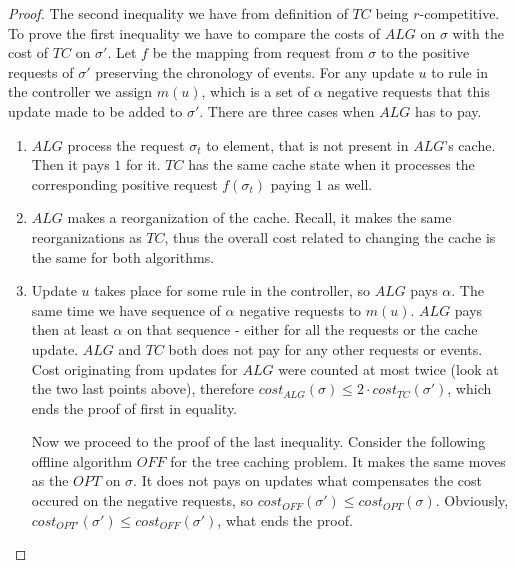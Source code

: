 \begin{proof}
The second inequality we have from definition of $TC$ being $r$-competitive. To
prove the first inequality we have to compare the costs of $ALG$ on $\sigma$
with the cost of $TC$ on $\sigma'$. Let $f$
be the mapping from request from $\sigma$ to the positive requests of $\sigma'$
preserving the chronology of events. For any update $u$ to rule in the
controller we assign $m(u)$, which is a set of $\alpha$ negative requests that this
update made to be added to $\sigma'$. There are three cases when $ALG$ has to pay.
\begin{enumerate}
\item $ALG$ process the request $\sigma_t$ to element, that is not present in
$ALG$'s cache. Then
it pays $1$ for it. $TC$ has the same cache state when it processes the corresponding
positive request $f(\sigma_t)$ paying $1$ as well.
\item $ALG$ makes a reorganization of the cache. Recall, it makes the same
reorganizations as $TC$, thus the overall cost related to changing the cache is
the same for both algorithms.
\item Update $u$ takes place for some rule in the controller, so $ALG$ pays $\alpha$.
The same time we have sequence of $\alpha$ negative requests to $m(u)$. $ALG$
pays then at least $\alpha$ on that sequence - either for all the requests or the
cache update.
$ALG$ and $TC$ both does not pay for any other requests or events. Cost originating
from updates for $ALG$ were counted at most twice (look at the two last points
above), therefore $cost_{ALG}(\sigma) \leq 2 \cdot cost_{TC}(\sigma')$, which
ends the proof of first in equality.

Now we proceed to the proof of the last inequality. Consider the following
offline algorithm $OFF$ for the tree caching problem. It makes the same moves as
the $OPT$ on $\sigma$. It does not pays on updates what compensates the cost
occured on the negative requests, so $cost_{OFF}(\sigma') \leq
cost_{OPT}(\sigma)$. Obviously, $cost_{OPT'}(\sigma') \leq cost_{OFF}(\sigma')$,
what ends the proof.
\end{enumerate}
\end{proof}
